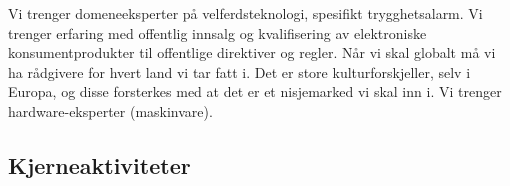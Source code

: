 Vi trenger domeneeksperter på velferdsteknologi, spesifikt trygghetsalarm. Vi
trenger erfaring med offentlig innsalg og kvalifisering av elektroniske
konsumentprodukter til offentlige direktiver og regler. Når vi skal globalt må
vi ha rådgivere for hvert land vi tar fatt i. Det er store kulturforskjeller,
selv i Europa, og disse forsterkes med at det er et nisjemarked vi skal inn i.
Vi trenger hardware-eksperter (maskinvare).




\subsection{Kjerneaktiviteter}




